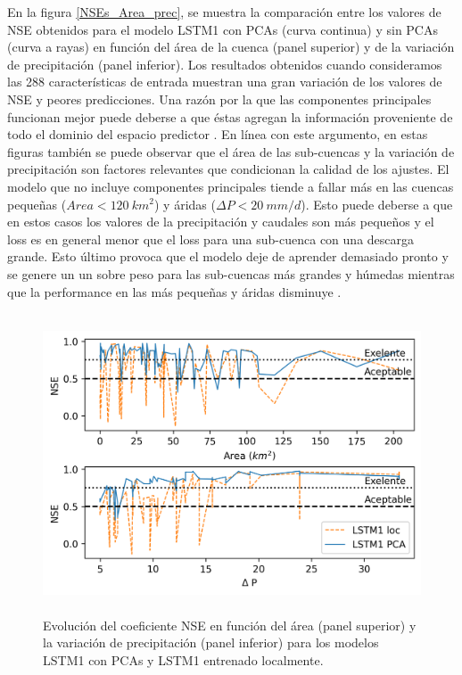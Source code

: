 En la figura \ref{NSEs_Area_prec}, se muestra la comparación entre los valores de NSE obtenidos para el modelo LSTM1 con PCAs 
(curva continua) y sin PCAs (curva a rayas) en función del área de la cuenca (panel superior) y de la variación de precipitación 
(panel inferior). Los resultados obtenidos cuando consideramos las 288 características
de entrada muestran una gran variación de los valores de NSE y peores predicciones. 
Una razón por la que las componentes principales funcionan mejor puede deberse a que éstas agregan la información proveniente de 
todo el dominio del espacio predictor \cite{Manu}. En línea con este argumento, en estas figuras también se puede observar que el 
área de las sub-cuencas y la variación de precipitación son factores relevantes que condicionan la calidad de los ajustes. 
El modelo que no incluye componentes principales  tiende a fallar más en las cuencas pequeñas ($Area  < 120~km^2$) y 
áridas  ($\Delta P < 20~mm/d$). Esto puede deberse a que en estos casos los 
valores de la precipitación y caudales son más pequeños y el loss es en general menor  que el loss para una sub-cuenca con
una descarga grande. Esto último provoca que el modelo deje de aprender demasiado pronto y se genere un
un sobre peso para las sub-cuencas más grandes y húmedas mientras que la performance en las 
más pequeñas y áridas disminuye \cite{Kratzert}.

\begin{figure}[h!]
  \begin{center}
    \includegraphics[height=3.5in]{Figures/NSE/comp_NSE_consinPCA2.png}
    \caption{ Evolución del coeficiente NSE en función del área (panel superior) y la variación de precipitación 
    (panel inferior) para los modelos LSTM1 con PCAs y LSTM1 entrenado localmente.}
    \label{NSE3}
  \end{center}
\end{figure}




